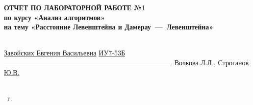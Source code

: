 \begin{titlepage}
	\fontsize{18pt}{18pt}\selectfont
	\begin{center}
        \textbf{ОТЧЕТ ПО ЛАБОРАТОРНОЙ РАБОТЕ №1}\\
        \textbf{по курсу «Анализ алгоритмов»}\\
        \textbf{на тему «Расстояние Левенштейна и Дамерау~---~Левенштейна»}\\
	\end{center}
    ~\\

	\fontsize{14pt}{14pt}\selectfont
	\noindent{}
    \uline{Завойских Евгения Васильевна}
    \newline\newline
	\noindent{}
    \uline{ИУ7-53Б}
    \newline\newline
	\noindent{}
    \uline{~~~~~~~~~~~~~~~~~~~~~~~~~~~~~~~~~~~~~~~~~~~~~~~~~}
    \newline\newline
	\noindent{}
    \uline{Волкова Л.Л., Строганов Ю.В.}
    \newline\newline
    ~\\
    ~\\
    \vspace{17mm}

	\begin{center}
		\the\year~г.
	\end{center}

    \restoregeometry
\end{titlepage}
